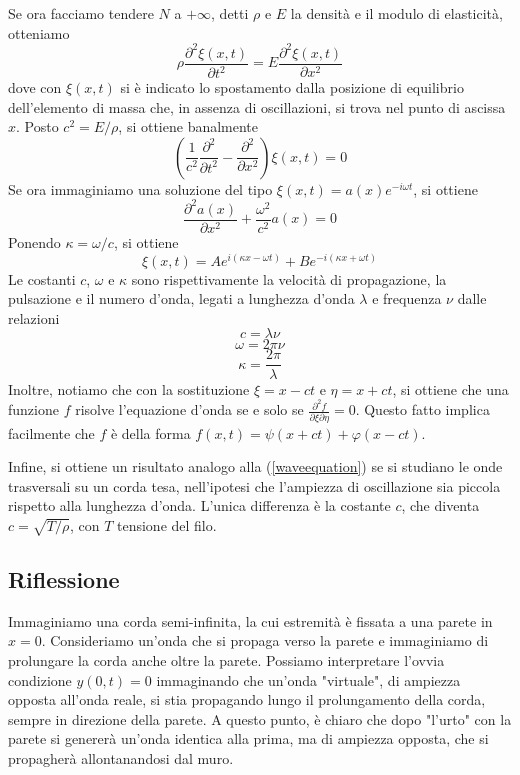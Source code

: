 \documentclass[a4paper,11pt]{article}
\begin{document}
\noindent Se ora facciamo tendere $N$ a $+\infty$, detti $\rho$ e $E$ la densità e il modulo di elasticità, otteniamo
\begin{equation}
\rho\frac{\partial^2\xi(x,t)}{\partial t^2}=E\frac{\partial^2\xi(x,t)}{\partial x^2}
\label{waveequation}
\end{equation}
dove con $\xi(x,t)$ si è indicato lo spostamento dalla posizione di equilibrio dell'elemento di massa che, in assenza di oscillazioni, si trova nel punto di ascissa $x$. Posto $c^2=E/\rho$, si ottiene banalmente
\[\left(\frac{1}{c^2}\frac{\partial^2}{\partial t^2}-\frac{\partial^2}{\partial x^2}\right)\xi(x,t)=0\]
Se ora immaginiamo una soluzione del tipo $\xi(x,t)=a(x)e^{-i\omega t}$, si ottiene
\[\frac{\partial^2a(x)}{\partial x^2}+\frac{\omega^2}{c^2}a(x)=0\]
Ponendo $\kappa=\omega/c$, si ottiene
\[\xi(x,t)=Ae^{i(\kappa x-\omega t)}+Be^{-i(\kappa x+\omega t)}\]
Le costanti $c$, $\omega$ e $\kappa$ sono rispettivamente la velocità di propagazione, la pulsazione e il numero d'onda, legati a lunghezza d'onda $\lambda$ e frequenza $\nu$ dalle relazioni
\[c=\lambda\nu\]
\[\omega=2\pi\nu\]
\[\kappa=\frac{2\pi}{\lambda}\]
Inoltre, notiamo che con la sostituzione $\xi=x-ct$ e $\eta=x+ct$, si ottiene che una funzione $f$ risolve l'equazione d'onda se e solo se $\frac{\partial^2f}{\partial\xi\partial\eta}=0$. Questo fatto implica facilmente che $f$ è della forma $f(x,t)=\psi(x+ct)+\varphi(x-ct)$.

\noindent Infine, si ottiene un risultato analogo alla (\ref{waveequation}) se si studiano le onde trasversali su un corda tesa, nell'ipotesi che l'ampiezza di oscillazione sia piccola rispetto alla lunghezza d'onda. L'unica differenza è la costante $c$, che diventa $c=\sqrt{T/\rho}$, con $T$ tensione del filo.

\subsection{Riflessione}
Immaginiamo una corda semi-infinita, la cui estremità è fissata a una parete in $x=0$. Consideriamo un'onda che si propaga verso la parete e immaginiamo di prolungare la corda anche oltre la parete. Possiamo interpretare l'ovvia condizione $y(0,t)=0$ immaginando che un'onda "virtuale", di ampiezza opposta all'onda reale, si stia propagando lungo il prolungamento della corda, sempre in direzione della parete. A questo punto, è chiaro che dopo "l'urto" con la parete si genererà un'onda identica alla prima, ma di ampiezza opposta, che si propagherà allontanandosi dal muro.
\end{document}
